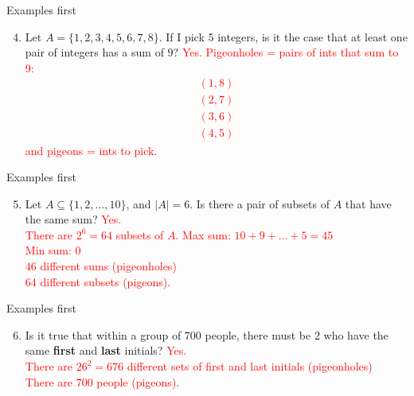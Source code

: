 \documentclass[dvipsnames]{beamer}
\newcommand{\?}{\textcolor{red}{\textbf{?}}}
\begin{document}
\begin{frame}{Examples first}
	\begin{enumerate}
	  \setcounter{enumi}{3}
		\item Let $A = \lbrace 1, 2, 3, 4, 5, 6,  7, 8 \rbrace$. If I pick 5 integers, is it the case that at least one pair of integers has a sum of $9$? \pause \textcolor{red}{Yes. Pigeonholes = pairs of ints that sum to 9: \begin{align*} 
								 (1, 8) \\ 
								(2, 7)\\  
								(3, 6) \\ 
								(4, 5)  
						\end{align*} 
			and pigeons = ints to pick.}
		\end{enumerate}
\end{frame}
\begin{frame}{Examples first}
	\begin{enumerate}
			  \setcounter{enumi}{4}
		\item  Let $A \subseteq \{ 1, 2, \dots , 10 \}$, and $\vert A \vert = 6$. Is there a pair of subsets of $A$ that have the same sum? \pause \textcolor{red}{Yes. \\There are $2^6 = 64$ subsets of $A$. Max sum: $10+9+\dots + 5 = 45$ \\ Min sum: $0$ \\ $46$ different sums (pigeonholes) \\ $64$ different subsets (pigeons).} 
		\end{enumerate}
\end{frame}

\begin{frame}{Examples first}
	\begin{enumerate}
				  \setcounter{enumi}{5}
		\item  Is it true that within a group of 700 people, there must be 2 who have the same \textbf{first} and \textbf{last} initials? \pause \textcolor{red}{Yes. \\ There are $26^2 = 676$ different sets of first and last initials (pigeonholes) \\ There are  700 people (pigeons).}
		\end{enumerate}
\end{frame}
\end{document}
